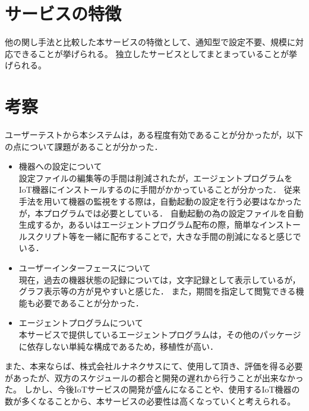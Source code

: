 \section{サービスの特徴}
他の関し手法と比較した本サービスの特徴として、通知型で設定不要、規模に対応できることが挙げられる。
独立したサービスとしてまとまっていることが挙げられる。




\section{考察}
ユーザーテストから本システムは，ある程度有効であることが分かったが，以下の点について課題があることが分かった．
\begin{itemize}
\item 機器への設定について\\
	設定ファイルの編集等の手間は削減されたが，エージェントプログラムをIoT機器にインストールするのに手間がかかっていることが分かった．
	従来手法を用いて機器の監視をする際は，自動起動の設定を行う必要はなかったが，本プログラムでは必要としている．
	自動起動の為の設定ファイルを自動生成するか，あるいはエージェントプログラム配布の際，簡単なインストールスクリプト等を一緒に配布することで，大きな手間の削減になると感じでいる．
\item ユーザーインターフェースについて\\
	現在，過去の機器状態の記録については，文字記録として表示しているが，グラフ表示等の方が見やすいと感じた．
	また，期間を指定して閲覧できる機能も必要であることが分かった．
\item エージェントプログラムについて\\
	本サービスで提供しているエージェントプログラムは，その他のパッケージに依存しない単純な構成であるため，移植性が高い．
\end{itemize}
また、本来ならば、株式会社ルナネクサスにて、使用して頂き、評価を得る必要があったが、双方のスケジュールの都合と開発の遅れから行うことが出来なかった。
しかし、今後IoTサービスの開発が盛んになることや、使用するIoT機器の数が多くなることから、本サービスの必要性は高くなっていくと考えられる。


